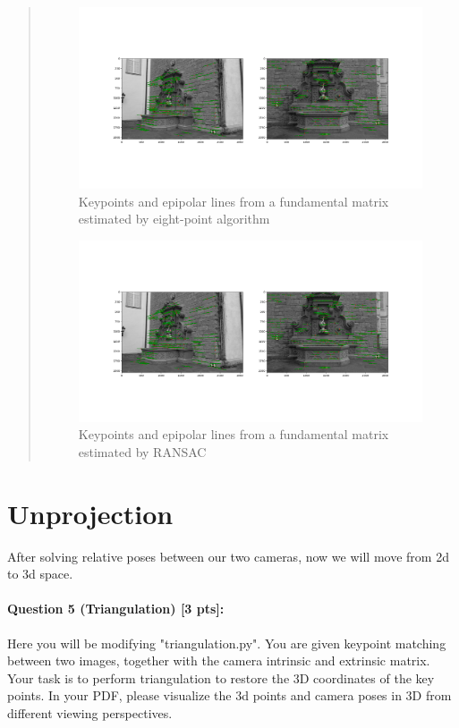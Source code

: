 \documentclass[11pt]{article}
\begin{document}
\begin{quote}
\begin{figure}[h]
    \centering
    \includegraphics[width=1.0\linewidth]{figs/epipolar_lines_8pts.png}
    \caption{Keypoints and epipolar lines from a fundamental matrix estimated by eight-point algorithm}
    \label{fig:epipolar_lines_8pts}
\end{figure}

\begin{figure}[h]
    \centering
    \includegraphics[width=1.0\linewidth]{figs/epipolar_lines_ransac.png}
    \caption{Keypoints and epipolar lines from a fundamental matrix estimated by RANSAC}
    \label{fig:epipolar_lines_ransac}
\end{figure}


\end{quote}

\section*{Unprojection} 
After solving relative poses between our two cameras, now we will move from 2d to 3d space.

\paragraph{Question 5 (Triangulation) [3 pts]:}
Here you will be modifying "triangulation.py". You are given keypoint matching between two images, together with the camera intrinsic and extrinsic matrix. Your task is to perform triangulation to restore the 3D coordinates of the key points. In your PDF, please visualize the 3d points and camera poses in 3D from different viewing perspectives. 
\end{document}
